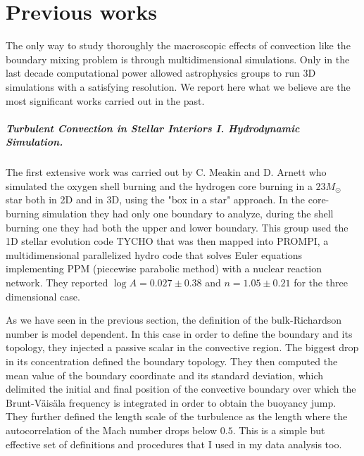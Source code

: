 
\chapter{Previous works}

The only way to study thoroughly the macroscopic effects of convection like the boundary mixing problem is through multidimensional simulations. Only in the last decade computational power allowed astrophysics groups to run 3D simulations with a satisfying resolution. We report here what we believe are the most significant works carried out in the past. 

\paragraph{Turbulent Convection in Stellar Interiors I. Hydrodynamic Simulation. \citet{meakin}} 
The first extensive work was carried out by C. Meakin and D. Arnett who simulated the oxygen shell burning and the hydrogen core burning in a $23 M_{\odot}$ star both in 2D and in 3D, using the "box in a star" approach. In the core-burning simulation they had only one boundary to analyze, during the shell burning one they had both the upper and lower boundary. This group used the 1D stellar evolution code TYCHO that was then mapped into PROMPI, a multidimensional parallelized hydro code that solves Euler equations implementing PPM (piecewise parabolic method) with a nuclear reaction network. They reported $\log A=0.027 \pm 0.38$ and $n=1.05 \pm 0.21$ for the three dimensional case. 

As we have seen in the previous section, the definition of the bulk-Richardson number is model dependent. In this case in order to define the boundary and its topology, they injected a passive scalar in the convective region. The biggest drop in its concentration defined the boundary topology. They then computed the mean value of the boundary coordinate and its standard deviation, which delimited the initial and final position of the convective boundary over which the Brunt-Väisäla frequency is integrated in order to obtain the buoyancy jump. They further defined the length scale of the turbulence as the length where the autocorrelation of the Mach number drops below $0.5$. This is a simple but effective set of definitions and procedures that I used in my data analysis too. 

